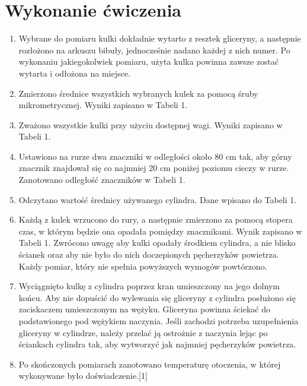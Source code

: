 \documentclass{article}
\begin{document}
\section{Wykonanie ćwiczenia}

\begin{enumerate}
    \item Wybrane do pomiaru kulki dokładnie wytarto z resztek gliceryny, a następnie rozłożono na arkuszu bibuły, jednocześnie nadano każdej z nich numer. Po wykonaniu jakiegokolwiek pomiaru, użyta kulka powinna zawsze zostać wytarta i odłożona na miejsce.
    
    \item Zmierzono średnice wszystkich wybranych kulek za pomocą śruby mikrometrycznej. Wyniki zapisano w Tabeli 1.
    
    \item Zważono wszystkie kulki przy użyciu dostępnej wagi. Wyniki zapisano w Tabeli 1.
    
    \item Ustawiono na rurze dwa znaczniki w odległości około 80 cm tak, aby górny znacznik znajdował się co najmniej 20 cm poniżej poziomu cieczy w rurze. Zanotowano odległość znaczników w Tabeli 1.
    
    \item Odczytano wartość średnicy używanego cylindra. Dane wpisano do Tabeli 1.
    
    \item Każdą z kulek wrzucono do rury, a następnie zmierzono za pomocą stopera czas, w którym będzie ona opadała pomiędzy znacznikami. Wynik zapisano w Tabeli 1. Zwrócono uwagę aby kulki opadały środkiem cylindra, a nie blisko ścianek oraz aby nie było do nich doczepionych pęcherzyków powietrza. Każdy pomiar, który nie spełnia powyższych wymogów powtórzono.
    
    \item Wyciągnięto kulkę z cylindra poprzez kran umieszczony na jego dolnym końcu. Aby nie dopuścić do wylewania się gliceryny z cylindra posłużono się zaciskaczem umieszczonym na wężyku. Gliceryna powinna ściekać do podstawionego pod wężykiem naczynia. Jeśli zachodzi potrzeba uzupełnienia gliceryny w cylindrze, należy przelać ją ostrożnie z naczynia lejąc po ściankach cylindra tak, aby wytworzyć jak najmniej pęcherzyków powietrza.
    
    \item Po skończonych pomiarach zanotowano temperaturę otoczenia, w której wykonywane było doświadczenie.[1]
\end{enumerate}
\end{document}

